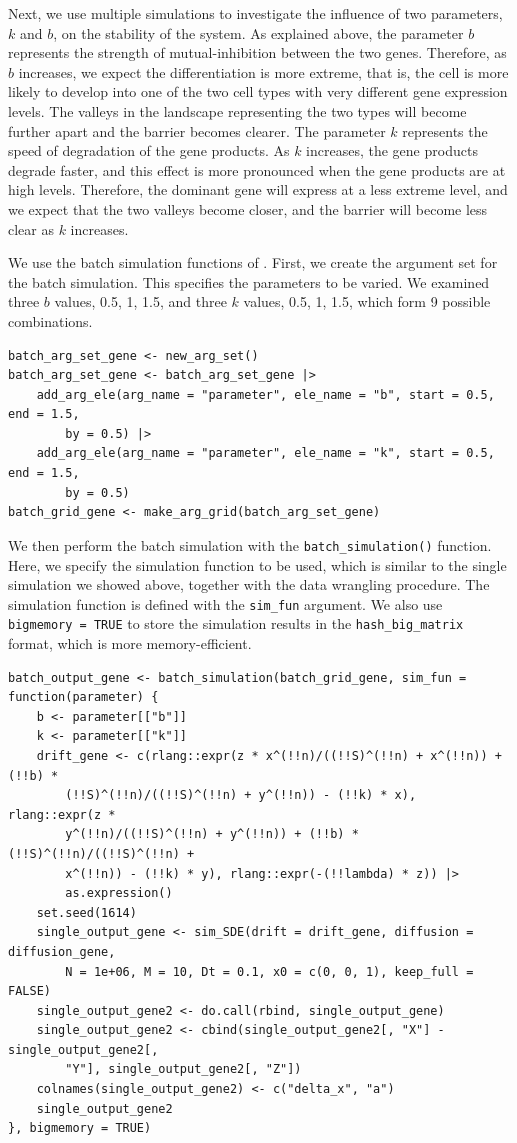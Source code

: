 Next, we use multiple simulations to investigate the influence of two parameters, \(k\) and \(b\), on the stability of the system. As explained above, the parameter \(b\) represents the strength of mutual-inhibition between the two genes. Therefore, as \(b\) increases, we expect the differentiation is more extreme, that is, the cell is more likely to develop into one of the two cell types with very different gene expression levels. The valleys in the landscape representing the two types will become further apart and the barrier becomes clearer. The parameter \(k\) represents the speed of degradation of the gene products. As \(k\) increases, the gene products degrade faster, and this effect is more pronounced when the gene products are at high levels. Therefore, the dominant gene will express at a less extreme level, and we expect that the two valleys become closer, and the barrier will become less clear as \(k\) increases.

We use the batch simulation functions of . First, we create the argument set for the batch simulation. This specifies the parameters to be varied. We examined three \(b\) values, 0.5, 1, 1.5, and three \(k\) values, 0.5, 1, 1.5, which form 9 possible combinations.

\begin{verbatim}
batch_arg_set_gene <- new_arg_set()
batch_arg_set_gene <- batch_arg_set_gene |>
    add_arg_ele(arg_name = "parameter", ele_name = "b", start = 0.5, end = 1.5,
        by = 0.5) |>
    add_arg_ele(arg_name = "parameter", ele_name = "k", start = 0.5, end = 1.5,
        by = 0.5)
batch_grid_gene <- make_arg_grid(batch_arg_set_gene)
\end{verbatim}

We then perform the batch simulation with the \texttt{batch\_simulation()} function. Here, we specify the simulation function to be used, which is similar to the single simulation we showed above, together with the data wrangling procedure. The simulation function is defined with the \texttt{sim\_fun} argument. We also use \texttt{bigmemory\ =\ TRUE} to store the simulation results in the \texttt{hash\_big\_matrix} format, which is more memory-efficient.

\begin{verbatim}
batch_output_gene <- batch_simulation(batch_grid_gene, sim_fun = function(parameter) {
    b <- parameter[["b"]]
    k <- parameter[["k"]]
    drift_gene <- c(rlang::expr(z * x^(!!n)/((!!S)^(!!n) + x^(!!n)) + (!!b) *
        (!!S)^(!!n)/((!!S)^(!!n) + y^(!!n)) - (!!k) * x), rlang::expr(z *
        y^(!!n)/((!!S)^(!!n) + y^(!!n)) + (!!b) * (!!S)^(!!n)/((!!S)^(!!n) +
        x^(!!n)) - (!!k) * y), rlang::expr(-(!!lambda) * z)) |>
        as.expression()
    set.seed(1614)
    single_output_gene <- sim_SDE(drift = drift_gene, diffusion = diffusion_gene,
        N = 1e+06, M = 10, Dt = 0.1, x0 = c(0, 0, 1), keep_full = FALSE)
    single_output_gene2 <- do.call(rbind, single_output_gene)
    single_output_gene2 <- cbind(single_output_gene2[, "X"] - single_output_gene2[,
        "Y"], single_output_gene2[, "Z"])
    colnames(single_output_gene2) <- c("delta_x", "a")
    single_output_gene2
}, bigmemory = TRUE)
\end{verbatim}

